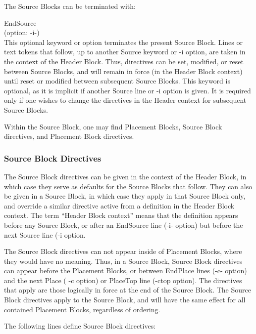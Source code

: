 The Source Blocks can be terminated with:

\begin{description}
\item{\vt EndSource}\\
(option: {\vt -i-})\\
This optional keyword or option terminates the present Source Block. 
Lines or text tokens that follow, up to another {\vt Source} keyword
or {\vt -i} option, are taken in the context of the Header Block. 
Thus, directives can be set, modified, or reset between Source Blocks,
and will remain in force (in the Header Block context) until reset or
modified between subsequent Source Blocks.  This keyword is optional,
as it is implicit if another {\vt Source} line or {\vt -i} option is
given.  It is required only if one wishes to change the directives in
the Header context for subsequent Source Blocks. 
\end{description}

Within the Source Block, one may find Placement Blocks, Source Block
directives, and Placement Block directives.

\subsubsection{Source Block Directives}

The Source Block directives can be given in the context of the Header
Block, in which case they serve as defaults for the Source Blocks that
follow.  They can also be given in a Source Block, in which case they
apply in that Source Block only, and override a similar directive
active from a definition in the Header Block context.  The term
``Header Block context'' means that the definition appears before any
Source Block, or after an {\vt EndSource} line ({\vt -i-} option) but
before the next {\vt Source} line ({\vt -i} option.

The Source Block directives can not appear inside of Placement Blocks,
where they would have no meaning.  Thus, in a Source Block, Source
Block directives can appear before the Placement Blocks, or between
{\vt EndPlace} lines ({\vt -c-} option) and the next {\vt Place} ({\vt
-c} option) or {\vt PlaceTop} line ({\vt -ctop} option).  The
directives that apply are those logically in force at the end of the
Source Block.  The Source Block directives apply to the Source Block,
and will have the same effect for all contained Placement Blocks,
regardless of ordering.

The following lines define Source Block directives:

